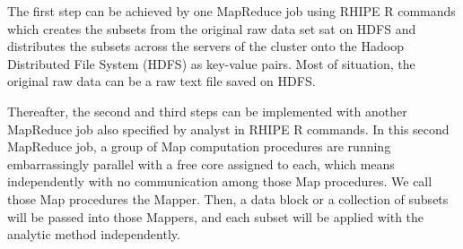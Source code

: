 The first step can be achieved by one MapReduce job using RHIPE R commands which 
creates the subsets from the original raw data set sat on HDFS and 
distributes the subsets across the servers of the cluster onto the Hadoop 
Distributed File System (HDFS) as key-value pairs. Most of situation, the original
raw data can be a raw text file saved on HDFS.

Thereafter, the second and
third steps can be implemented with another MapReduce job also specified by
analyst in RHIPE R commands. In this second MapReduce job, a group of Map
computation procedures are running embarrassingly parallel with a free core 
assigned to each, which means independently with no communication among those Map
procedures. We call those Map procedures the Mapper. Then, a data block or a 
collection of subsets will be passed into those Mappers, and each subset
will be applied with the analytic method independently.

